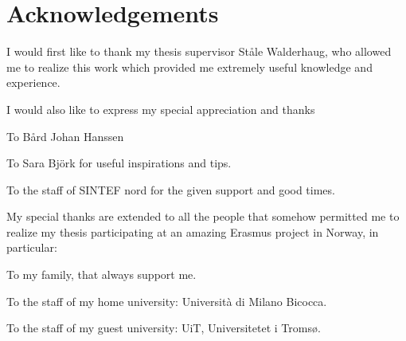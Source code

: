\clearpage 
\chapter{Acknowledgements}

I would first like to thank my thesis supervisor Ståle Walderhaug, who allowed me to realize this work which provided me extremely useful knowledge and experience.

\vspace{+0.5cm}

I would also like to express my special appreciation and thanks 

\hspace{1cm} To Bård Johan Hanssen

\hspace{1cm} To Sara Björk for useful inspirations and tips. 

\hspace{1cm}  To the staff of SINTEF nord for the given support and good times. 

\vspace{+0.5cm}
 
My special thanks are extended to all the people that somehow permitted me to realize my thesis participating at an amazing Erasmus project in Norway, in particular:

\hspace{1cm} To my family,  that always support me.

\hspace{1cm}  To the staff of my home university: Università di Milano Bicocca.

\hspace{1cm}  To the staff of my guest university: UiT, Universitetet i Tromsø.

 	 
 	 
 	 


